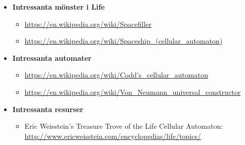 \begin{itemize}

\item[] \textbf{Intressanta mönster i Life}

\begin{itemize}[noitemsep,topsep=0pt]
    \item \url{https://en.wikipedia.org/wiki/Spacefiller}
    \item \url{https://en.wikipedia.org/wiki/Spaceship_(cellular_automaton)}
\end{itemize}

\item[] \textbf{Intressanta automater}

\begin{itemize}[noitemsep,topsep=0pt]
	\item \url{https://en.wikipedia.org/wiki/Codd's_cellular_automaton}
	\item \url{https://en.wikipedia.org/wiki/Von_Neumann_universal_constructor}
\end{itemize}

\item[] \textbf{Intressanta resurser}

\begin{itemize}[noitemsep,topsep=0pt]
    \item Eric Weisstein's Treasure Trove of the Life Cellular Automaton: \\ \url{http://www.ericweisstein.com/encyclopedias/life/topics/}
\end{itemize}

\end{itemize}









